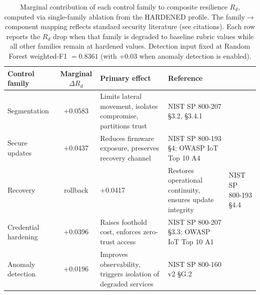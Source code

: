 \begin{table}[t]
\centering
\caption{Marginal contribution of each control family to composite resilience $R_d$, computed via single-family ablation from the HARDENED profile. The family$\to$component mapping reflects standard security literature (see citations). Each row reports the $R_d$ drop when that family is degraded to baseline rubric values while all other families remain at hardened values. Detection input fixed at Random Forest weighted-F1 $= 0.8361$ (with $+0.03$ when anomaly detection is enabled).}
\label{tab:control_ablation}
\small
\begin{tabular}{lcll}
\toprule
Control family & Marginal $\Delta R_d$ & Primary effect & Reference \\
\midrule
Segmentation & +0.0583 & Limits lateral movement, isolates compromise, partitions trust & NIST SP 800-207 §3.2, §3.4.1 \\
Secure updates & +0.0437 & Reduces firmware exposure, preserves recovery channel & NIST SP 800-193 §4; OWASP IoT Top 10 A4 \\
Recovery & rollback & +0.0417 & Restores operational continuity, ensures update integrity & NIST SP 800-193 §4.4 \\
Credential hardening & +0.0396 & Raises foothold cost, enforces zero-trust access & NIST SP 800-207 §3.3; OWASP IoT Top 10 A1 \\
Anomaly detection & +0.0196 & Improves observability, triggers isolation of degraded services & NIST SP 800-160 v2 §G.2 \\
\bottomrule
\end{tabular}
\end{table}